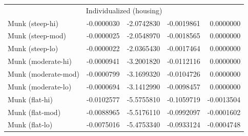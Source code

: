 \begin{table}
\begin{tabular}[c]{lrrrr}
\multicolumn{5}{c}{Individualized (housing)}\\
Munk (steep-hi) &-0.0000030&-2.0742830&-0.0019861&0.0000000\\
Munk (steep-mod) &-0.0000025&-2.0548970&-0.0018565&0.0000000\\
Munk (steep-lo) &-0.0000022&-2.0365430&-0.0017464&0.0000000\\
Munk (moderate-hi)&-0.0000941&-3.2001820&-0.0112116&0.0000000\\
Munk (moderate-mod)&-0.0000799&-3.1699320&-0.0104726&0.0000000\\
Munk (moderate-lo)&-0.0000694&-3.1412990&-0.0098457&0.0000000\\
Munk (flat-hi) &-0.0102577&-5.5755810&-0.1059719&-0.0013504\\
Munk (flat-mod) &-0.0088965&-5.5176110&-0.0992097&-0.0001602\\
Munk (flat-lo) &-0.0075016&-5.4753340&-0.0933124&-0.0004748\\
		\hline
	\end{tabular}
\end{table}
\resetgeometry

